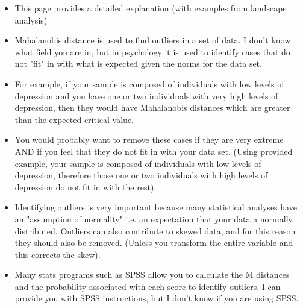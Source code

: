 \documentclass[11pt]{article} %
\begin{document}
\begin{itemize}

\item This page provides a detailed explanation (with examples from landscape analysis)


\item Mahalanobis distance is used to find outliers in a set of data. I don't know what field you are in, but in psychology it is used to identify cases that do not "fit" in with what is expected given the norms for the data set. 

\item For example, if your sample is composed of individuals with low levels of depression and you have one or two individuals with very high levels of depression, then they would have Mahalanobis distances which are greater than the expected critical value. 

\item You would probably want to remove these cases if they are very extreme AND if you feel that they do not fit in with your data set. (Using provided example, your sample is composed of individuals with low levels of depression, therefore those one or two individuals with high levels of depression do not fit in with the rest). 

\item Identifying outliers is very important because many statistical analyses have an "assumption of normality" i.e. an expectation that your data a normally distributed. Outliers can also contribute to skewed data, and for this reason they should also be removed. (Unless you transform the entire variable and this corrects the skew). 

\item Many stats programs such as SPSS allow you to calculate the M distances and the probability associated with each score to identify outliers. I can provide you with SPSS instructions, but I don't know if you are using SPSS.
\end{itemize}
\end{document}
